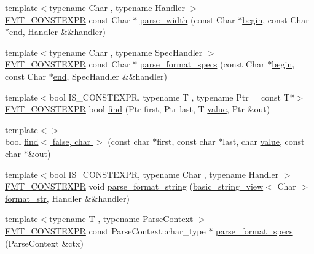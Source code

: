 \begin{DoxyCompactItemize}
\item 
{\footnotesize template$<$typename Char , typename Handler $>$ }\\\hyperlink{core_8h_a69201cb276383873487bf68b4ef8b4cd}{F\+M\+T\+\_\+\+C\+O\+N\+S\+T\+E\+X\+PR} const Char $\ast$ \hyperlink{namespaceinternal_aa5e9c93ad05ebd920505acdd2122ede6}{parse\+\_\+width} (const Char $\ast$\hyperlink{namespaceinternal_a265f36d9dee68d3f44381347ef2fd5cb}{begin}, const Char $\ast$\hyperlink{namespaceinternal_a94820de1710dc8038fa6f188adfe299b}{end}, Handler \&\&handler)
\item 
{\footnotesize template$<$typename Char , typename Spec\+Handler $>$ }\\\hyperlink{core_8h_a69201cb276383873487bf68b4ef8b4cd}{F\+M\+T\+\_\+\+C\+O\+N\+S\+T\+E\+X\+PR} const Char $\ast$ \hyperlink{namespaceinternal_af89a4b19adfe070b0cb66cf9f694caf3}{parse\+\_\+format\+\_\+specs} (const Char $\ast$\hyperlink{namespaceinternal_a265f36d9dee68d3f44381347ef2fd5cb}{begin}, const Char $\ast$\hyperlink{namespaceinternal_a94820de1710dc8038fa6f188adfe299b}{end}, Spec\+Handler \&\&handler)
\item 
{\footnotesize template$<$bool I\+S\+\_\+\+C\+O\+N\+S\+T\+E\+X\+PR, typename T , typename Ptr  = const T$\ast$$>$ }\\\hyperlink{core_8h_a69201cb276383873487bf68b4ef8b4cd}{F\+M\+T\+\_\+\+C\+O\+N\+S\+T\+E\+X\+PR} bool \hyperlink{namespaceinternal_a1fb268779155d9e5cb2ee01298cf5541}{find} (Ptr first, Ptr last, T \hyperlink{classinternal_1_1value}{value}, Ptr \&out)
\item 
{\footnotesize template$<$$>$ }\\bool \hyperlink{namespaceinternal_a3bd0e0a06013bfea262462a5b187ce27}{find$<$ false, char $>$} (const char $\ast$first, const char $\ast$last, char \hyperlink{classinternal_1_1value}{value}, const char $\ast$\&out)
\item 
{\footnotesize template$<$bool I\+S\+\_\+\+C\+O\+N\+S\+T\+E\+X\+PR, typename Char , typename Handler $>$ }\\\hyperlink{core_8h_a69201cb276383873487bf68b4ef8b4cd}{F\+M\+T\+\_\+\+C\+O\+N\+S\+T\+E\+X\+PR} void \hyperlink{namespaceinternal_a47fffd25c13670b8e2eb6559caeef974}{parse\+\_\+format\+\_\+string} (\hyperlink{classbasic__string__view}{basic\+\_\+string\+\_\+view}$<$ Char $>$ \hyperlink{format_8h_aa2b402011ee0619f2158f13e0827e585}{format\+\_\+str}, Handler \&\&handler)
\item 
{\footnotesize template$<$typename T , typename Parse\+Context $>$ }\\\hyperlink{core_8h_a69201cb276383873487bf68b4ef8b4cd}{F\+M\+T\+\_\+\+C\+O\+N\+S\+T\+E\+X\+PR} const Parse\+Context\+::char\+\_\+type $\ast$ \hyperlink{namespaceinternal_ac21f85f51ec37023df70a5a8288130d7}{parse\+\_\+format\+\_\+specs} (Parse\+Context \&ctx)

\end{DoxyCompactItemize}
